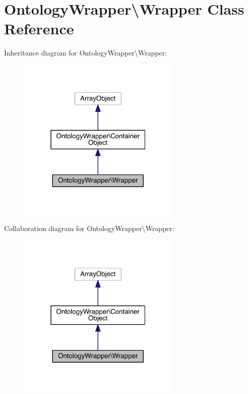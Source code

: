 \hypertarget{class_ontology_wrapper_1_1_wrapper}{\section{Ontology\-Wrapper\textbackslash{}Wrapper Class Reference}
\label{class_ontology_wrapper_1_1_wrapper}
}


Inheritance diagram for Ontology\-Wrapper\textbackslash{}Wrapper\-:\nopagebreak
\begin{figure}[H]
\begin{center}
\leavevmode
\includegraphics[width=220pt]{class_ontology_wrapper_1_1_wrapper__inherit__graph}
\end{center}
\end{figure}


Collaboration diagram for Ontology\-Wrapper\textbackslash{}Wrapper\-:\nopagebreak
\begin{figure}[H]
\begin{center}
\leavevmode
\includegraphics[width=220pt]{class_ontology_wrapper_1_1_wrapper__coll__graph}
\end{center}
\end{figure}
